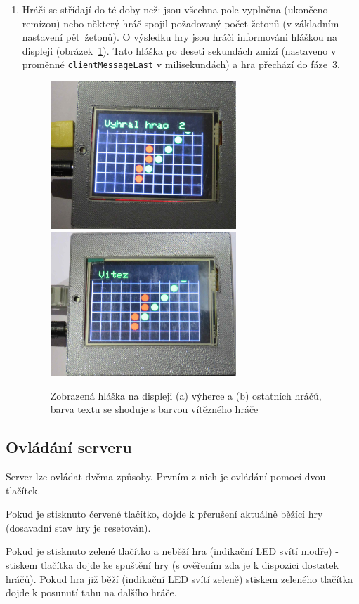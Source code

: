 \begin{enumerate}
\item Hráči se střídají do té doby než: jsou všechna pole vyplněna (ukončeno remízou) nebo některý hráč spojil požadovaný počet žetonů (v základním nastavení pět~žetonů). O výsledku hry jsou hráči informováni hláškou na displeji (obrázek~\ref{fig:faze6}). Tato hláška po deseti sekundách zmizí (nastaveno v proměnné \texttt{clientMessageLast} v milisekundách) a hra přechází do fáze~3.
\begin{figure}[H]
\centering
\includegraphics[width=7cm, angle=0]{img/gameFlow/phase06a.jpg}
\includegraphics[width=7cm, angle=0]{img/gameFlow/phase06b.jpg}
\caption{\label{fig:faze6} Zobrazená hláška na displeji (a) výherce a (b) ostatních hráčů, barva textu se shoduje s barvou vítězného hráče}
\end{figure}
\end{enumerate}
\subsection{Ovládání serveru}
Server lze ovládat dvěma způsoby. Prvním z nich je ovládání pomocí dvou tlačítek.

Pokud je stisknuto červené tlačítko, dojde k přerušení aktuálně běžící hry (dosavadní stav hry je resetován).

Pokud je stisknuto zelené tlačítko a neběží hra (indikační LED svítí modře) - stiskem tlačítka dojde ke spuštění hry (s ověřením zda je k dispozici dostatek hráčů).
Pokud hra již běží (indikační LED svítí zeleně) stiskem zeleného tlačítka dojde k posunutí tahu na dalšího hráče.

